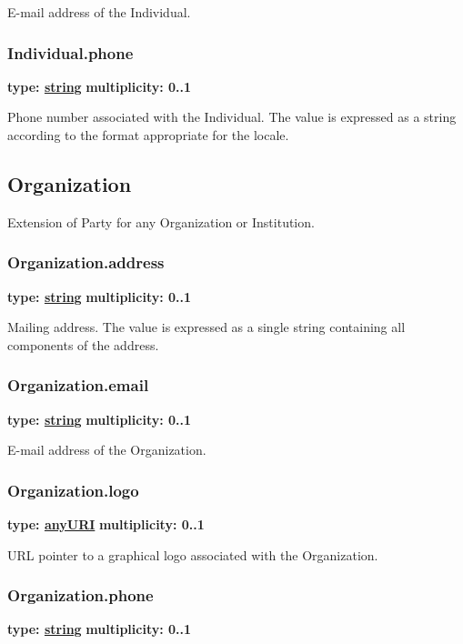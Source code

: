   E-mail address of the Individual.
  
  \subsubsection{Individual.phone}
  \textbf{type: \hyperref[sect:ivoa]{string}} \newline
  \textbf{multiplicity: 0..1} \newline
  
  Phone number associated with the Individual. The value is expressed as a string
  according to the format appropriate for the locale.
  

  \subsection{Organization}
  Extension of Party for any Organization or Institution.
  
  \subsubsection{Organization.address}
  \textbf{type: \hyperref[sect:ivoa]{string}} \newline
  \textbf{multiplicity: 0..1} \newline
  
  Mailing address. The value is expressed as a single string containing all
  components of the address.
    
  \subsubsection{Organization.email}
  \textbf{type: \hyperref[sect:ivoa]{string}} \newline
  \textbf{multiplicity: 0..1} \newline
  
  E-mail address of the Organization.
  
  \subsubsection{Organization.logo}
  \textbf{type: \hyperref[sect:ivoa]{anyURI}} \newline
  \textbf{multiplicity: 0..1} \newline
  
  URL pointer to a graphical logo associated with the Organization.
    
  \subsubsection{Organization.phone}
  \textbf{type: \hyperref[sect:ivoa]{string}} \newline
  \textbf{multiplicity: 0..1} \newline
  
